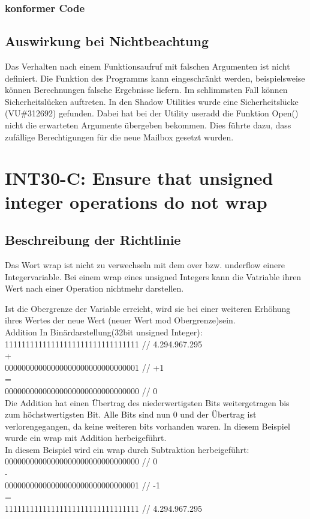 \documentclass[12pt]{article}
\begin{document}
\subsubsection{konformer Code}



\subsection{Auswirkung bei Nichtbeachtung}
Das Verhalten nach einem Funktionsaufruf mit falschen Argumenten ist nicht definiert. Die Funktion des Programms kann eingeschränkt werden, beispielsweise können Berechnungen falsche Ergebnisse liefern. Im schlimmsten Fall können Sicherheitslücken auftreten. In den Shadow Utilities wurde eine Sicherheitslücke (VU\#312692) gefunden. Dabei hat bei der Utility useradd die Funktion Open() nicht die erwarteten Argumente übergeben bekommen. Dies führte dazu, dass zufällige Berechtigungen für die neue Mailbox gesetzt wurden.

\newpage
\section{INT30-C: Ensure that unsigned integer operations do not wrap}
\subsection{Beschreibung der Richtlinie}
Das Wort wrap ist nicht zu verwechseln mit dem over bzw. underflow einere Integervariable. Bei einem wrap eines unsigned Integers kann die Vatriable ihren Wert nach einer Operation nichtmehr darstellen. 

Ist die Obergrenze der Variable erreicht, wird sie bei einer weiteren Erhöhung ihres Wertes der neue Wert (neuer Wert mod Obergrenze)sein.\\
Addition In Binärdarstellung(32bit unsigned Integer):\\
11111111111111111111111111111111  // 4.294.967.295\\
+\\
00000000000000000000000000000001  // +1\\
=\\
00000000000000000000000000000000  // 0\\
Die Addition hat einen Übertrag des niederwertigsten Bits weitergetragen bis zum höchstwertigsten Bit. Alle Bits sind nun 0 und der Übertrag ist verlorengegangen, da keine weiteren bits vorhanden waren. In diesem Beispiel wurde ein wrap mit Addition herbeigeführt. \\
In diesem Beispiel wird ein wrap durch Subtraktion herbeigeführt:\\
00000000000000000000000000000000 // 0\\
-\\
00000000000000000000000000000001 // -1\\
=\\
11111111111111111111111111111111 // 4.294.967.295\\
\end{document}
